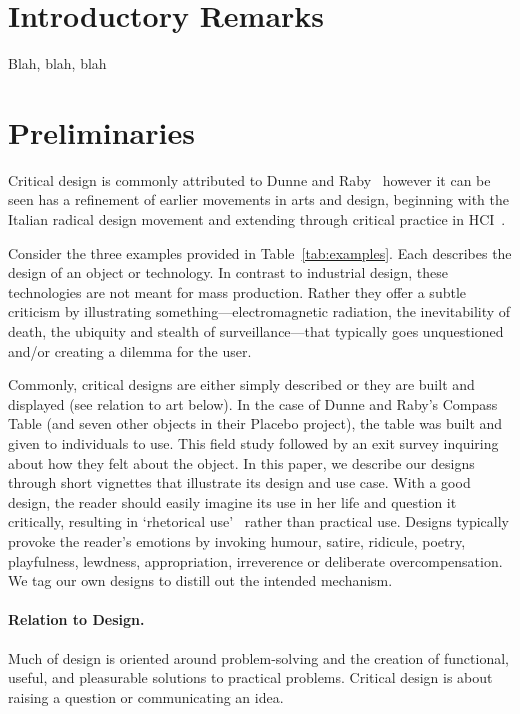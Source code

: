 
\section{Introductory Remarks}

Blah, blah, blah

\section{Preliminaries}



Critical design is commonly attributed to Dunne and Raby~\cite{DuRa01,Dun05} however it can be seen has a refinement of earlier movements in arts and design, beginning with the Italian radical design movement and extending through critical practice in HCI~\cite{Mal17}. 

Consider the three examples provided in Table~\ref{tab:examples}. Each describes the design of an object or technology. In contrast to industrial design, these technologies are not meant for mass production. Rather they offer a subtle criticism by illustrating something---electromagnetic radiation, the inevitability of death, the ubiquity and stealth of surveillance---that typically goes unquestioned and/or creating a dilemma for the user.

Commonly, critical designs are either simply described or they are built and displayed (see relation to art below). In the case of Dunne and Raby's Compass Table (and seven other objects in their Placebo project), the table was built and given to individuals to use. This field study followed by an exit survey inquiring about how they felt about the object. In this paper, we describe our designs through short vignettes that illustrate its design and use case. With a good design, the reader should easily imagine its use in her life and question it critically, resulting in `rhetorical use'~\cite{Mal17} rather than practical use. Designs typically provoke the reader's emotions by invoking humour, satire, ridicule, poetry, playfulness, lewdness, appropriation, irreverence or deliberate overcompensation. We tag our own designs to distill out the intended mechanism.

\paragraph{Relation to Design.}

Much of design is oriented around problem-solving and the creation of functional, useful, and pleasurable solutions to practical problems. Critical design is about raising a question or communicating an idea.

